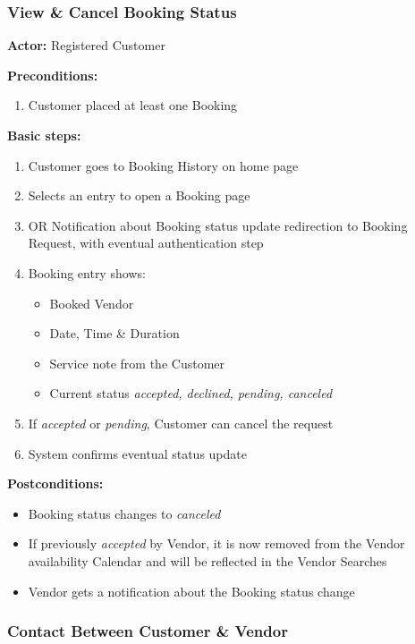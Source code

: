 \documentclass[11pt,a4paper]{article}
\begin{document}
\subsubsection{View \& Cancel Booking Status}

\textbf{Actor:} Registered Customer

\noindent \textbf{Preconditions:}
\begin{enumerate}
  \item Customer placed at least one Booking
\end{enumerate}

\noindent \textbf{Basic steps:}
\begin{enumerate}
  \item Customer goes to Booking History on home page
  \item Selects an entry to open a Booking page
  \item OR Notification about Booking status update redirection to
    Booking Request, with eventual authentication step
  \item Booking entry shows:
    \begin{itemize}
      \item Booked Vendor
      \item Date, Time \& Duration
      \item Service note from the Customer
      \item Current status \textit{accepted, declined, pending, canceled}
    \end{itemize}
  \item If \textit{accepted} or \textit{pending}, Customer can cancel
    the request
  \item System confirms eventual status update
\end{enumerate}

\noindent \textbf{Postconditions:}
\begin{itemize}
  \item Booking status changes to \textit{canceled}
  \item If previously \textit{accepted} by Vendor, it is now
    removed from the Vendor availability Calendar and will be
    reflected in the Vendor Searches
  \item Vendor gets a notification about the Booking status change
\end{itemize}

\subsubsection{Contact Between Customer \& Vendor}
\end{document}
